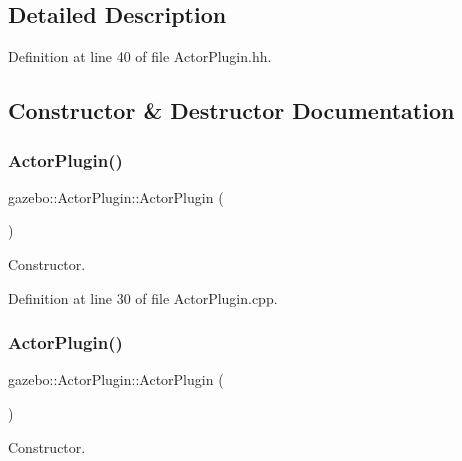 \subsection{Detailed Description}


Definition at line 40 of file Actor\+Plugin.\+hh.



\subsection{Constructor \& Destructor Documentation}
\mbox{\label{classgazebo_1_1ActorPlugin_ab8db0f2c6a6e64f252033664932da9bb}} 
\subsubsection{\texorpdfstring{ActorPlugin()}{ActorPlugin()}\hspace{0.1cm}{\footnotesize\ttfamily [1/2]}}
{\footnotesize\ttfamily gazebo\+::\+Actor\+Plugin\+::\+Actor\+Plugin (\begin{DoxyParamCaption}{ }\end{DoxyParamCaption})}



Constructor. 



Definition at line 30 of file Actor\+Plugin.\+cpp.

\mbox{\label{classgazebo_1_1ActorPlugin_ab8db0f2c6a6e64f252033664932da9bb}} 
\subsubsection{\texorpdfstring{ActorPlugin()}{ActorPlugin()}\hspace{0.1cm}{\footnotesize\ttfamily [2/2]}}
{\footnotesize\ttfamily gazebo\+::\+Actor\+Plugin\+::\+Actor\+Plugin (\begin{DoxyParamCaption}{ }\end{DoxyParamCaption})}



Constructor. 



